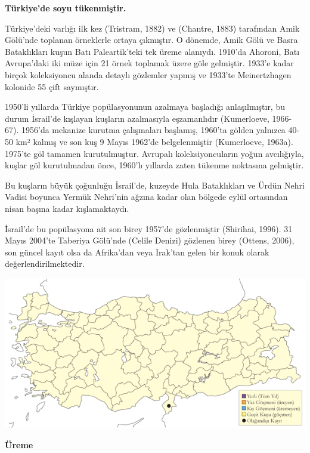 \documentclass[
  a4paper,
  DIV=11,
  numbers=noendperiod]{scrreprt}
\begin{document}
\textbf{Türkiye'de soyu tükenmiştir.}

Türkiye'deki varlığı ilk kez (Tristram, 1882) ve (Chantre, 1883)
tarafından Amik Gölü'nde toplanan örneklerle ortaya çıkmıştır. O
dönemde, Amik Gölü ve Basra Bataklıkları kuşun Batı Paleartik'teki tek
üreme alanıydı. 1910'da Ahoroni, Batı Avrupa'daki iki müze için 21 örnek
toplamak üzere göle gelmiştir. 1933'e kadar birçok koleksiyoncu alanda
detaylı gözlemler yapmış ve 1933'te Meinertzhagen kolonide 55 çift
saymıştır.

1950'li yıllarda Türkiye popülasyonunun azalmaya başladığı
anlaşılmıştır, bu durum İsrail'de kışlayan kuşların azalmasıyla
eşzamanlıdır (Kumerloeve, 1966-67). 1956'da mekanize kurutma çalışmaları
başlamış, 1960'ta gölden yalnızca 40-50 km² kalmış ve son kuş 9 Mayıs
1962'de belgelenmiştir (Kumerloeve, 1963a). 1975'te göl tamamen
kurutulmuştur. Avrupalı koleksiyoncuların yoğun avcılığıyla, kuşlar göl
kurutulmadan önce, 1960'lı yıllarda zaten tükenme noktasına gelmiştir.

Bu kuşların büyük çoğunluğu İsrail'de, kuzeyde Hula Bataklıkları ve
Ürdün Nehri Vadisi boyunca Yermük Nehri'nin ağzına kadar olan bölgede
eylül ortasından nisan başına kadar kışlamaktaydı.

İsrail'de bu popülasyona ait son birey 1957'de gözlenmiştir (Shirihai,
1996). 31 Mayıs 2004'te Taberiya Gölü'nde (Celile Denizi) gözlenen birey
(Ottens, 2006), son güncel kayıt olsa da Afrika'dan veya Irak'tan gelen
bir konuk olarak değerlendirilmektedir.

\includegraphics{images/harita_Page_080.png}

\textbf{Üreme}
\end{document}
